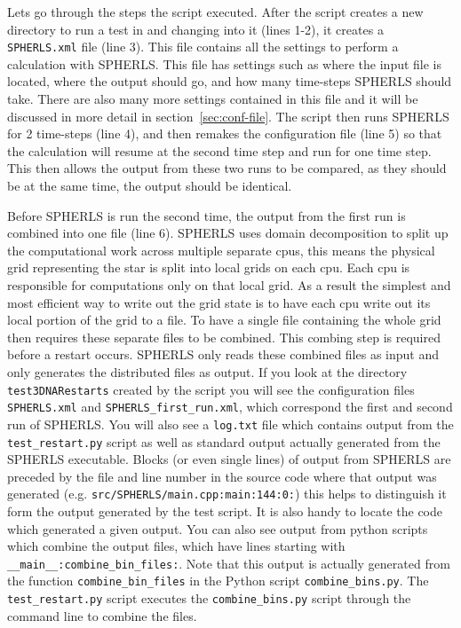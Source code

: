\documentclass[12pt,a4paper]{book}
\begin{document}
Lets go through the steps the script executed. After the script creates a new directory to run a test in and changing into it (lines 1-2), it creates a {\tt SPHERLS.xml} file (line 3). This file contains all the settings to perform a calculation with SPHERLS. This file has settings such as where the input file is located, where the output should go, and how many time-steps SPHERLS should take. There are also many more settings contained in this file and it will be discussed in more detail in section~\ref{sec:conf-file}. The script then runs SPHERLS for 2 time-steps (line 4), and then remakes the configuration file (line 5) so that the calculation will resume at the second time step and run for one time step. This then allows the output from these two runs to be compared, as they should be at the same time, the output should be identical. 

Before SPHERLS is run the second time, the output from the first run is combined into one file (line 6). SPHERLS uses domain decomposition to split up the computational work across multiple separate cpus, this means the physical grid representing the star is split into local grids on each cpu. Each cpu is responsible for computations only on that local grid. As a result the simplest and most efficient way to write out the grid state is to have each cpu write out its local portion of the grid to a file. To have a single file containing the whole grid then requires these separate files to be combined. This combing step is required before a restart occurs. SPHERLS only reads these combined files as input and only generates the distributed files as output. If you look at the directory {\tt test3DNARestarts} created by the script you will see the configuration files {\tt SPHERLS.xml} and {\tt SPHERLS\_first\_run.xml}, which correspond the first and second run of SPHERLS. You will also see a {\tt log.txt} file which contains output from the {\tt test\_restart.py} script as well as standard output actually generated from the SPHERLS executable. Blocks (or even single lines) of output from SPHERLS are preceded by the file and line number in the source code where that output was generated (e.g. {\tt src/SPHERLS/main.cpp:main:144:0:}) this helps to distinguish it form the output generated by the test script. It is also handy to locate the code which generated a given output. You can also see output from python scripts which combine the output files, which have lines starting with {\tt \_\_main\_\_:combine\_bin\_files:}. Note that this output is actually generated from the function {\tt combine\_bin\_files} in the Python script {\tt combine\_bins.py}. The {\tt test\_restart.py} script executes the {\tt combine\_bins.py} script through the command line to combine the files. 
\end{document}
